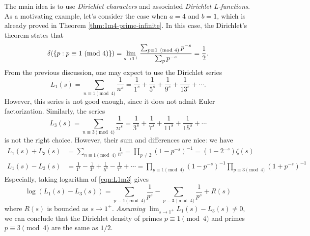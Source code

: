 The main idea is to use \emph{Dirichlet characters} and associated \emph{Dirichlet L-functions}.
As a motivating example, let's consider the case when $a = 4$ and $b = 1$, which is already proved in Theorem \ref{thm:1m4-prime-infinite}.
In this case, the Dirichlet's theorem states that
\begin{equation}
    \label{eqn:dirichlet-1m4}
    \delta(\{p : p \equiv 1 \ (\mathrm{mod}\ 4)\}) = \lim_{s \to 1^+} \frac{\sum_{p \equiv 1 \pmod{4}} p^{-s}}{\sum_{p} p^{-s}} = \frac{1}{2}.
\end{equation}
From the previous discussion, one may expect to use the Dirichlet series
\[
L_1(s) = \sum_{n \equiv 1 \pmod{4}} \frac{1}{n^s} = \frac{1}{1^s} + \frac{1}{5^s} + \frac{1}{9^s} + \frac{1}{13^s} + \cdots.
\]
However, this series is not good enough, since it does not admit Euler factorization.
Similarly, the series
\[
L_3(s) = \sum_{n \equiv 3 \pmod{4}} \frac{1}{n^s} = \frac{1}{3^s} + \frac{1}{7^s} + \frac{1}{11^s} + \frac{1}{15^s} + \cdots
\]
is not the right choice.
However, their sum and differences are nice: we have
\begin{align}
    L_1(s) + L_3(s) &= \sum_{n \equiv 1 \pmod{4}} \frac{1}{n^s} = \prod_{p \ne 2} (1 - p^{-s})^{-1} = (1 - 2^{-s})\zeta(s) \label{eqn:L1p3} \\
    L_1(s) - L_3(s) &= \frac{1}{1^s} - \frac{1}{3^s} + \frac{1}{5^s} - \frac{1}{7^s} + \cdots = \prod_{p \equiv 1 \pmod{4}} (1 - p^{-s})^{-1} \prod_{p \equiv 3 \pmod{4}} (1 + p^{-s})^{-1} \label{eqn:L1m3}
\end{align}
Especially, taking logarithm of \eqref{eqn:L1m3} gives
\[
\log (L_1(s) - L_3(s)) = \sum_{p \equiv 1 \pmod{4}} \frac{1}{p^s} - \sum_{p \equiv 3 \pmod{4}} \frac{1}{p^s} + R(s)
\]
where $R(s)$ is bounded as $s \to 1^+$.
\emph{Assuming $\lim_{s \to 1^+} L_1(s) - L_3(s) \ne 0$}, we can conclude that the Dirichlet density of primes $p \equiv 1 \pmod{4}$ and primes $p \equiv 3 \pmod{4}$ are the same as $1/2$.

